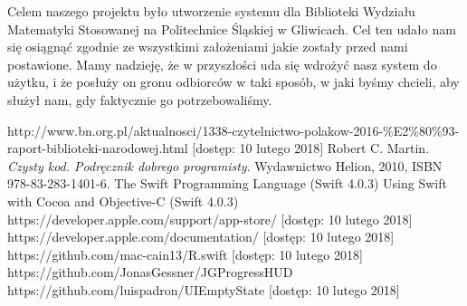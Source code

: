\documentclass[twoside]{projektInzynierskiMS}
\begin{document}
Celem naszego projektu było utworzenie systemu dla Biblioteki Wydziału Matematyki Stosowanej na Politechnice Śląskiej w Gliwicach. Cel ten udało nam się osiągnąć zgodnie ze wszystkimi założeniami jakie zostały przed nami postawione. Mamy nadzieję, że w przyszłości uda się wdrożyć nasz system do użytku, i że posłuży on gronu odbiorców w taki sposób, w jaki byśmy chcieli, aby służył nam, gdy faktycznie go potrzebowaliśmy.


\begin{thebibliography}{12}

 http://www.bn.org.pl/aktualnosci/1338-czytelnictwo-polakow-2016-\%E2\%80\%93-raport-biblioteki-narodowej.html [dostęp: 10 lutego 2018]
Robert C. Martin. 
\textit{Czysty kod. Podręcznik dobrego programisty}. 
Wydawnictwo Helion, 2010, ISBN 978-83-283-1401-6.
 The Swift Programming Language (Swift 4.0.3)
 Using Swift with Cocoa and Objective-C (Swift 4.0.3)
 https://developer.apple.com/support/app-store/ [dostęp: 10 lutego 2018]
 https://developer.apple.com/documentation/ [dostęp: 10 lutego 2018]
 https://github.com/mac-cain13/R.swift [dostęp: 10 lutego 2018]
 https://github.com/JonasGessner/JGProgressHUD
 https://github.com/luispadron/UIEmptyState [dostęp: 10 lutego 2018]

\end{thebibliography}
\end{document}
